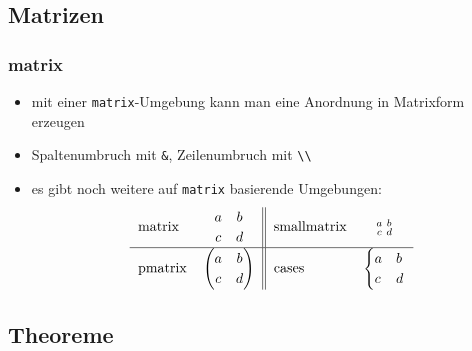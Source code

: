\subsection{Matrizen}

\begin{frame}[fragile]
\frametitle{matrix}
\newcommand\entry[1]{#1 & $\begin{#1} a & b \\ c & d \end{#1}$}
\begin{itemize}[<+->]
  \item mit einer \texttt{matrix}-Umgebung kann man eine Anordnung in Matrixform erzeugen
  \item Spaltenumbruch mit \lstinline[style=Latex]+&+, Zeilenumbruch mit \lstinline[style=Latex]+\\+
  \item es gibt noch weitere auf \texttt{matrix} basierende Umgebungen:\\
    \[\renewcommand\arraystretch{1.2}
    \begin{tabular}{lc||lc}
      \entry{matrix} & \entry{smallmatrix} \\\hline
      \entry{pmatrix} & \entry{cases}
    \end{tabular}\]\textbf{}
\end{itemize}
\end{frame}


\subsection{Theoreme}

